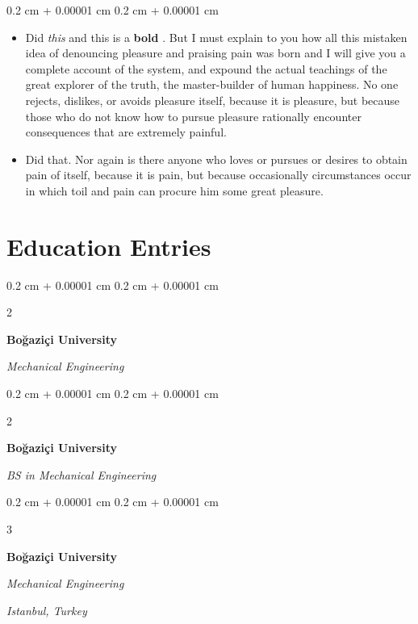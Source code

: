 \documentclass[10pt, letterpaper]{article}
\newenvironment{highlights}{
    \begin{itemize}[
        topsep=0.10 cm,
        parsep=0.10 cm,
        partopsep=0pt,
        itemsep=0pt,
        leftmargin=0.4 cm + 10pt + 0.6 cm
    ]
}{
    \end{itemize}
} %
\newenvironment{onecolentry}{
    \begin{adjustwidth}{
        0.2 cm + 0.00001 cm
    }{
        0.2 cm + 0.00001 cm
    }
}{
    \end{adjustwidth}
} %
\newenvironment{onecolentrybulleted}{
    \onecolentry
    \setcolumnwidth{0.6 cm, \fill}
    \begin{paracol}{2}
    \vspace*{\fill}
    \textbullet
    \vspace*{3px}
    \vspace*{\fill}
    \switchcolumn
}{
    \end{paracol}
    \endonecolentry
} %
\newenvironment{threecolentry}[3][]{
    \onecolentry
    \def\thirdColumn{#3}
    \setcolumnwidth{0.6 cm, \fill, 4.5 cm}
    \begin{paracol}{3}
    #2 \switchcolumn
}{
    \switchcolumn \raggedleft \thirdColumn
    \end{paracol}
    \endonecolentry
} %
\let\hrefWithoutArrow\href
\renewcommand{\href}[2]{\hrefWithoutArrow{#1}{\mbox{\ifthenelse{\equal{#2}{}}{ }{#2 }\raisebox{.15ex}{\footnotesize \faExternalLink*}}}}
\begin{document}
        \vspace{0.10 cm-3px}
        \begin{onecolentry}
            \begin{highlights}
                \item Did \textit{this} and this is a \textbf{bold} \href{https://example.com}{link}. But I must explain to you how all this mistaken idea of denouncing pleasure and praising pain was born and I will give you a complete account of the system, and expound the actual teachings of the great explorer of the truth, the master-builder of human happiness. No one rejects, dislikes, or avoids pleasure itself, because it is pleasure, but because those who do not know how to pursue pleasure rationally encounter consequences that are extremely painful.
                \item Did that. Nor again is there anyone who loves or pursues or desires to obtain pain of itself, because it is pain, but because occasionally circumstances occur in which toil and pain can procure him some great pleasure.
            \end{highlights}
        \end{onecolentry}



    
    \section{Education Entries}

        
        \begin{onecolentrybulleted}
            \textbf{Boğaziçi University}

            \textit{Mechanical Engineering}
        \end{onecolentrybulleted}



        \vspace{0.2 cm-3px}

        \begin{onecolentrybulleted}
            \textbf{Boğaziçi University}

            \textit{BS in Mechanical Engineering}
        \end{onecolentrybulleted}



        \vspace{0.2 cm-3px}

        \begin{threecolentry}{
            \vspace*{\fill}
            \textbullet
            \vspace*{3px}
            \vspace*{\fill}
        }{
        \textit{Istanbul, Turkey}    
            
        }
            \textbf{Boğaziçi University}

            \textit{Mechanical Engineering}
        \end{threecolentry}
\end{document}
